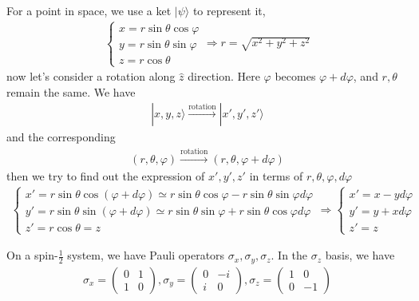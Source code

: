 \documentclass[UTF8,12pt]{article} %
\begin{document}
For a point in space, we use a ket $|\psi\rangle$ to represent it,
\begin{align*}
\begin{cases}x = r\sin\theta\cos\varphi \\ y = r\sin\theta\sin\varphi \\ z = r\cos\theta\end{cases} \Rightarrow r = \sqrt{x^{2} + y^{2} +z^{2}}
\end{align*}
now let's consider a rotation along $\hat{z}$ direction. Here $\varphi$ becomes $\varphi + d\varphi$, and $r,\theta$ remain the same. We have 
\begin{align}
|x,y,z\rangle \xrightarrow{\text{rotation}} |x', y', z'\rangle
\end{align}
and the corresponding
\begin{align}
(r,\theta,\varphi) \xrightarrow{\text{rotation}} (r, \theta, \varphi + d\varphi)
\end{align}
then we try to find out the expression of $x',y',z'$ in terms of $r,\theta,\varphi, d\varphi$
\begin{align}
\begin{cases}
x' = r\sin\theta\cos(\varphi+d\varphi) \simeq r\sin\theta\cos\varphi - r\sin\theta\sin\varphi d\varphi \\
y' = r\sin\theta\sin(\varphi+d\varphi) \simeq  r\sin\theta\sin\varphi + r\sin\theta\cos\varphi d\varphi \\
z' = r\cos\theta = z
\end{cases}
\Rightarrow \begin{cases}
x' = x - yd\varphi\\
y' = y + xd\varphi\\
z' = z
\end{cases}
\end{align}

On a spin-$\frac{1}{2}$ system, we have Pauli operators $\sigma_{x}, \sigma_{y}, \sigma_{z}$. In the $\sigma_{z}$ basis, we have
\begin{align}
\sigma_{x} = \begin{pmatrix}0&1\\1&0\end{pmatrix}, \sigma_{y} = \begin{pmatrix}0&-i\\i&0\end{pmatrix}, \sigma_{z} = \begin{pmatrix}1&0\\0&-1\end{pmatrix}
\end{align}
\end{document}
